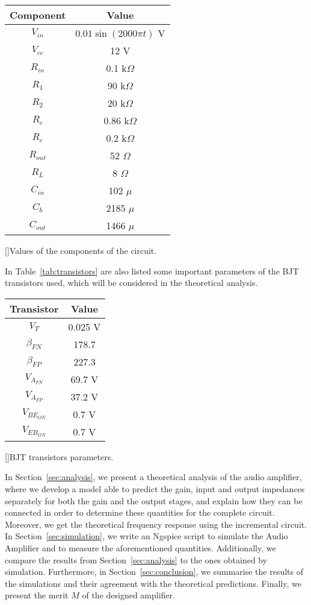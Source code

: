 \begin{center}
\begin{tabular}{ | c | c | }
\hline
\textbf{Component} & \textbf{Value} \\
\hline
$V_{in}$ & $0.01\sin{(2000\pi t)}$ V \\
\hline
$V_{cc}$ & 12 V \\
\hline
$R_{in}$ & 0.1 k$\Omega$ \\
\hline
$R_1$ & 90 k$\Omega$ \\
\hline
$R_2$ & 20 k$\Omega$ \\
\hline
$R_c$ & 0.86 k$\Omega$ \\
\hline
$R_e$ & 0.2 k$\Omega$ \\
\hline
$R_{out}$ & 52 $\Omega$ \\
\hline
$R_L$ & 8 $\Omega$ \\
\hline
$C_{in}$ & 102 $\mu$ \\
\hline
$C_b$ & 2185 $\mu$ \\
\hline
$C_{out}$ & 1466 $\mu$ \\
\hline
\end{tabular}\label{tab:components}
[]{Values of the components of the circuit.}
\end{center}

In Table~\ref{tab:transistors} are also listed some important parameters of the BJT transistors used, which will be considered in the theoretical analysis.

\begin{center}
\begin{tabular}{ | c | c | }
\hline
\textbf{Transistor} & \textbf{Value}\\
\hline
$V_T$ & 0.025 V \\
\hline
$\beta_{FN}$ & 178.7 \\
\hline
$\beta_{FP}$ & 227.3 \\
\hline
$V_{A_{FN}}$ & 69.7 V \\
\hline
$V_{A_{FP}}$ & 37.2 V \\
\hline
$V_{{BE}_{ON}}$ & 0.7 V \\
\hline
$V_{{EB}_{ON}}$ & 0.7 V \\
\hline
\end{tabular}\label{tab:transistors}
[]{BJT transistors parameters.}
\end{center}

In Section~\ref{sec:analysis}, we present a theoretical analysis of the audio amplifier, where we develop a model able to predict the gain, input and output impedances separately for both the gain and the output stages, and explain how they can be connected in order to determine these quantities for the complete circuit. Moreover, we get the theoretical frequency response using the incremental circuit. In Section~\ref{sec:simulation}, we write an Ngspice script to simulate the Audio Amplifier and to measure the aforementioned quantities. Additionally, we compare the results from Section~\ref{sec:analysis} to the ones obtained by simulation. Furthermore, in Section~\ref{sec:conclusion}, we summarise the results of the simulations and their agreement with the theoretical predictions. Finally, we present the merit $M$ of the designed amplifier.

